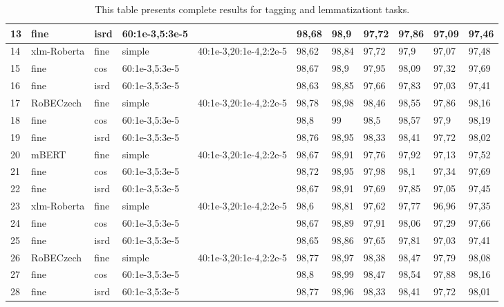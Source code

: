 \begin{table}[]
\begin{tabular}{lllllllllll}
13 & fine        & isrd  & 60:1e-3,5:3e-5 &                        & 98,68  & 98,9    & 97,72   & 97,86    & 97,09     & 97,46      \\ \hline
14 & xlm-Roberta & fine  & simple         & 40:1e-3,20:1e-4,2:2e-5 & 98,62  & 98,84   & 97,72   & 97,9     & 97,07     & 97,48      \\ \hline
15 & fine        & cos   & 60:1e-3,5:3e-5 &                        & 98,67  & 98,9    & 97,95   & 98,09    & 97,32     & 97,69      \\ \hline
16 & fine        & isrd  & 60:1e-3,5:3e-5 &                        & 98,63  & 98,85   & 97,66   & 97,83    & 97,03     & 97,41      \\ \hline
17 & RoBECzech   & fine  & simple         & 40:1e-3,20:1e-4,2:2e-5 & 98,78  & 98,98   & 98,46   & 98,55    & 97,86     & 98,16      \\ \hline
18 & fine        & cos   & 60:1e-3,5:3e-5 &                        & 98,8   & 99      & 98,5    & 98,57    & 97,9      & 98,19      \\ \hline
19 & fine        & isrd  & 60:1e-3,5:3e-5 &                        & 98,76  & 98,95   & 98,33   & 98,41    & 97,72     & 98,02      \\ \hline
20 & mBERT       & fine  & simple         & 40:1e-3,20:1e-4,2:2e-5 & 98,67  & 98,91   & 97,76   & 97,92    & 97,13     & 97,52      \\ \hline
21 & fine        & cos   & 60:1e-3,5:3e-5 &                        & 98,72  & 98,95   & 97,98   & 98,1     & 97,34     & 97,69      \\ \hline
22 & fine        & isrd  & 60:1e-3,5:3e-5 &                        & 98,67  & 98,91   & 97,69   & 97,85    & 97,05     & 97,45      \\ \hline
23 & xlm-Roberta & fine  & simple         & 40:1e-3,20:1e-4,2:2e-5 & 98,6   & 98,81   & 97,62   & 97,77    & 96,96     & 97,35      \\ \hline
24 & fine        & cos   & 60:1e-3,5:3e-5 &                        & 98,67  & 98,89   & 97,91   & 98,06    & 97,29     & 97,66      \\ \hline
25 & fine        & isrd  & 60:1e-3,5:3e-5 &                        & 98,65  & 98,86   & 97,65   & 97,81    & 97,03     & 97,41      \\ \hline
26 & RoBECzech   & fine  & simple         & 40:1e-3,20:1e-4,2:2e-5 & 98,77  & 98,97   & 98,38   & 98,47    & 97,79     & 98,08      \\ \hline
27 & fine        & cos   & 60:1e-3,5:3e-5 &                        & 98,8   & 98,99   & 98,47   & 98,54    & 97,88     & 98,16      \\ \hline
28 & fine        & isrd  & 60:1e-3,5:3e-5 &                        & 98,77  & 98,96   & 98,33   & 98,41    & 97,72     & 98,01      \\ \hline
\end{tabular}
\label{tab:all_res_tl}
\caption{This table presents complete results for tagging and lemmatizationt tasks. }
\end{table}

